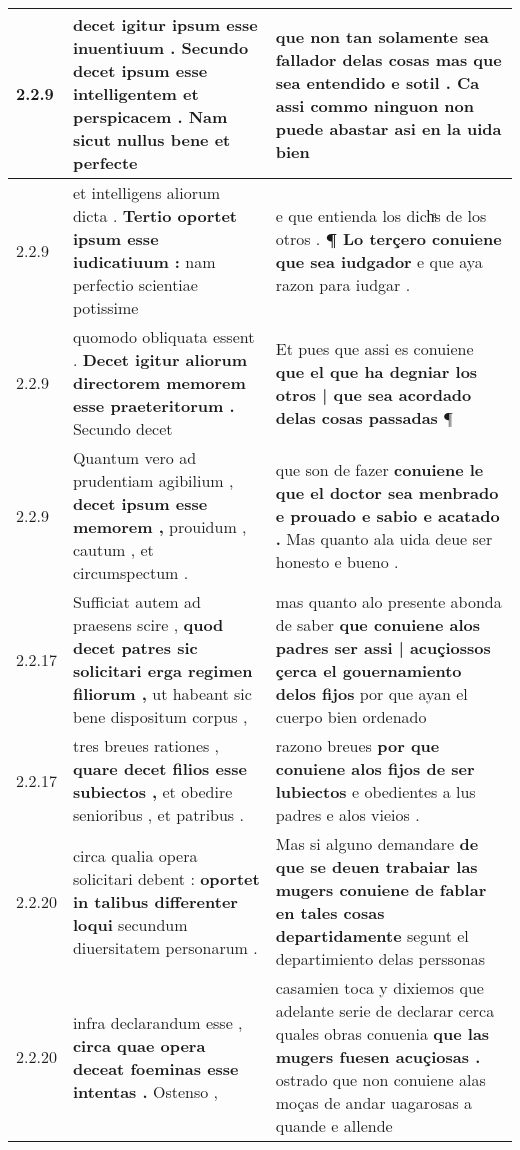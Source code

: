 \begin{tabular}{|p{1cm}|p{6.5cm}|p{6.5cm}|}
2.2.9 & decet igitur ipsum esse inuentiuum . \textbf{ Secundo decet ipsum esse intelligentem et perspicacem . } Nam sicut nullus bene et perfecte & que non tan solamente sea fallador delas cosas \textbf{ mas que sea entendido e sotil . Ca assi commo ninguon non puede abastar } asi en la uida bien \\\hline
2.2.9 & et intelligens aliorum dicta . \textbf{ Tertio oportet ipsum esse iudicatiuum : } nam perfectio scientiae potissime & e que entienda los dichͣs de los otros . \textbf{ ¶ Lo terçero conuiene que sea iudgador } e que aya razon para iudgar . \\\hline
2.2.9 & quomodo obliquata essent . \textbf{ Decet igitur aliorum directorem memorem esse praeteritorum . } Secundo decet & Et pues que assi es conuiene \textbf{ que el que ha degniar los otros | que sea acordado delas cosas passadas } ¶ \\\hline
2.2.9 & Quantum vero ad prudentiam agibilium , \textbf{ decet ipsum esse memorem , } prouidum , cautum , et circumspectum . & que son de fazer \textbf{ conuiene le que el doctor sea menbrado e prouado e sabio e acatado . } Mas quanto ala uida deue ser honesto e bueno . \\\hline
2.2.17 & Sufficiat autem ad praesens scire , \textbf{ quod decet patres sic solicitari erga regimen filiorum , } ut habeant sic bene dispositum corpus , & mas quanto alo presente abonda de saber \textbf{ que conuiene alos padres ser assi | acuçiossos çerca el gouernamiento delos fijos } por que ayan el cuerpo bien ordenado \\\hline
2.2.17 & tres breues rationes , \textbf{ quare decet filios esse subiectos , } et obedire senioribus , et patribus . & razono breues \textbf{ por que conuiene alos fijos de ser lubiectos } e obedientes a lus padres e alos vieios . \\\hline
2.2.20 & circa qualia opera solicitari debent : \textbf{ oportet in talibus differenter loqui } secundum diuersitatem personarum . & Mas si alguno demandare \textbf{ de que se deuen trabaiar las mugers conuiene de fablar en tales cosas departidamente } segunt el departimiento delas perssonas \\\hline
2.2.20 & infra declarandum esse , \textbf{ circa quae opera deceat foeminas esse intentas . } Ostenso , & casamien toca y dixiemos que adelante serie de declarar cerca quales obras conuenia \textbf{ que las mugers fuesen acuçiosas . } ostrado que non conuiene alas moças de andar uagarosas a quande e allende \\\hline

\end{tabular}
